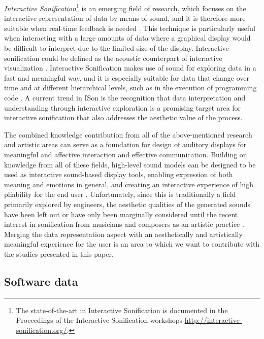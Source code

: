 \documentclass[manuscript,screen]{acmart}
\begin{document}
\textit{Interactive Sonification}\footnote{ The state-of-the-art in Interactive Sonification is documented in the Proceedings of the Interactive Sonification workshops \url{http://interactive-sonification.org/}.} is an emerging field of research, which focuses on the interactive representation of data by means of sound, and it is therefore more suitable when real-time feedback is needed \cite{hunt2011interactive,bresin2012interactive}. This technique is particularly useful when interacting with a large amounts of data where a graphical display would be difficult to interpret due to the limited size of the display. Interactive sonification could be defined as the acoustic counterpart of interactive visualization \cite{spence2006information}. Interactive Sonification makes use of sound for exploring data in a fast and meaningful way, and it is especially suitable for data that change over time and at different hierarchical levels, such as in the execution of programming code \cite{barra2002multimodal,DebashiVickers2018}. A current trend in ISon is the recognition that data interpretation and understanding through interactive exploration is a promising target area for interactive sonification that also addresses the aesthetic value of the process.

The combined knowledge contribution from all of the above-mentioned research and artistic areas can serve as a foundation for design of auditory displays for meaningful and affective interaction and effective communication. Building on knowledge from all of these fields, high-level sound models can be designed to be used as interactive sound-based display tools, enabling expression of both meaning and emotions in general, and creating an interactive experience of high pliability for the end user \cite{lowgren2009toward}.
Unfortunately, since this is traditionally a field primarily explored by engineers, the aesthetic qualities of the generated sounds have been left out or have only been marginally considered until the recent interest in sonification from musicians and composers as an artistic practice \cite{barrass2011sonification, vickers2014sonification}. Merging the data representation aspect with an aesthetically and artistically meaningful experience for the user is an area to which we want to contribute with the studies presented in this paper.




\subsection{Software data}
\end{document}
